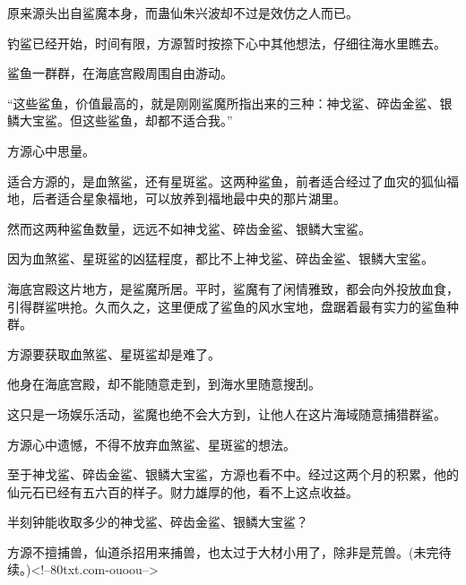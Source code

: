 \begin{this_body}
原来源头出自鲨魔本身，而蛊仙朱兴波却不过是效仿之人而已。

钓鲨已经开始，时间有限，方源暂时按捺下心中其他想法，仔细往海水里瞧去。

鲨鱼一群群，在海底宫殿周围自由游动。

“这些鲨鱼，价值最高的，就是刚刚鲨魔所指出来的三种：神戈鲨、碎齿金鲨、银鳞大宝鲨。但这些鲨鱼，却都不适合我。”

方源心中思量。

适合方源的，是血煞鲨，还有星斑鲨。这两种鲨鱼，前者适合经过了血灾的狐仙福地，后者适合星象福地，可以放养到福地最中央的那片湖里。

然而这两种鲨鱼数量，远远不如神戈鲨、碎齿金鲨、银鳞大宝鲨。

因为血煞鲨、星斑鲨的凶猛程度，都比不上神戈鲨、碎齿金鲨、银鳞大宝鲨。

海底宫殿这片地方，是鲨魔所居。平时，鲨魔有了闲情雅致，都会向外投放血食，引得群鲨哄抢。久而久之，这里便成了鲨鱼的风水宝地，盘踞着最有实力的鲨鱼种群。

方源要获取血煞鲨、星斑鲨却是难了。

他身在海底宫殿，却不能随意走到，到海水里随意搜刮。

这只是一场娱乐活动，鲨魔也绝不会大方到，让他人在这片海域随意捕猎群鲨。

方源心中遗憾，不得不放弃血煞鲨、星斑鲨的想法。

至于神戈鲨、碎齿金鲨、银鳞大宝鲨，方源也看不中。经过这两个月的积累，他的仙元石已经有五六百的样子。财力雄厚的他，看不上这点收益。

半刻钟能收取多少的神戈鲨、碎齿金鲨、银鳞大宝鲨？

方源不擅捕兽，仙道杀招用来捕兽，也太过于大材小用了，除非是荒兽。(未完待续。)<!--80txt.com-ouoou-->

\end{this_body}

